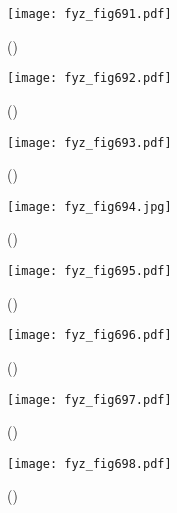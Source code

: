     \begin{figure}[ht!] %
      \centering
      \texttt{[image: fyz\_fig691.pdf]}
      \caption{
               (\cite[s.~707]{Feynman02})}
      \label{fyz:fig691}
    \end{figure}


    \begin{figure}[ht!] %
      \centering
      \texttt{[image: fyz\_fig692.pdf]}
      \caption{
               (\cite[s.~707]{Feynman02})}
      \label{fyz:fig692}
    \end{figure}

    \begin{figure}[ht!] %
      \centering
      \texttt{[image: fyz\_fig693.pdf]}
      \caption{
               (\cite[s.~707]{Feynman02})}
      \label{fyz:fig693}
    \end{figure}

    \begin{figure}[ht!] %
      \centering
      \texttt{[image: fyz\_fig694.jpg]}
      \caption{
               (\cite[s.~707]{Feynman02})}
      \label{fyz:fig694}
    \end{figure}

    \begin{figure}[ht!] %
      \centering
      \texttt{[image: fyz\_fig695.pdf]}
      \caption{
               (\cite[s.~707]{Feynman02})}
      \label{fyz:fig695}
    \end{figure}

    \begin{figure}[ht!] %
      \centering
      \texttt{[image: fyz\_fig696.pdf]}
      \caption{
               (\cite[s.~707]{Feynman02})}
      \label{fyz:fig696}
    \end{figure}

    \begin{figure}[ht!] %
      \centering
      \texttt{[image: fyz\_fig697.pdf]}
      \caption{
               (\cite[s.~707]{Feynman02})}
      \label{fyz:fig697}
    \end{figure}

    \begin{figure}[ht!] %
      \centering
      \texttt{[image: fyz\_fig698.pdf]}
      \caption{
               (\cite[s.~707]{Feynman02})}
      \label{fyz:fig698}
    \end{figure}


